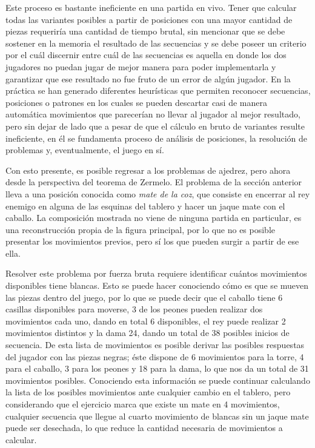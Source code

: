 \documentclass[twoside,openright,12pt,a4paper,spanish]{book}
\begin{document}
Este proceso es bastante ineficiente en una partida en vivo. Tener que calcular todas las variantes posibles a partir de posiciones con una mayor cantidad de piezas requeriría una cantidad de tiempo brutal, sin mencionar que se debe sostener en la memoria el resultado de las secuencias y se debe poseer un criterio por el cuál discernir entre cuál de las secuencias es aquella en donde los dos jugadores no puedan jugar de mejor manera para poder implementarla y garantizar que ese resultado no fue fruto de un error de algún jugador. En la práctica se han generado diferentes heurísticas que permiten reconocer secuencias, posiciones o patrones en los cuales se pueden descartar casi de manera automática movimientos que parecerían no llevar al jugador al mejor resultado, pero sin dejar de lado que a pesar de que el cálculo en bruto de variantes resulte ineficiente, en él se fundamenta proceso de análisis de posiciones, la resolución de problemas y, eventualmente, el juego en sí.

Con esto presente, es posible regresar a los problemas de ajedrez, pero ahora desde la perspectiva del teorema de Zermelo. El problema de la sección anterior lleva a una posición conocida como \emph{mate de la coz}, que consiste en encerrar al rey enemigo en alguna de las esquinas del tablero y hacer un jaque mate con el caballo. La composición mostrada no viene de ninguna partida en particular, es una reconstrucción propia de la figura principal, por lo que no es posible presentar los movimientos previos, pero sí los que pueden surgir a partir de ese ella.

Resolver este problema por fuerza bruta requiere identificar cuántos movimientos disponibles tiene blancas. Esto se puede hacer conociendo cómo es que se mueven las piezas dentro del juego, por lo que se puede decir que el caballo tiene 6 casillas disponibles para moverse, 3 de los peones pueden realizar dos movimientos cada uno, dando en total 6 disponibles, el rey puede realizar 2 movimientos distintos y la dama 24, dando un total de 38 posibles inicios de secuencia. De esta lista de movimientos es posible derivar las posibles respuestas del jugador con las piezas negras; éste dispone de 6 movimientos para la torre, 4 para el caballo, 3 para los peones y 18 para la dama, lo que nos da un total de 31 movimientos posibles. Conociendo esta información se puede continuar calculando la lista de los posibles movimientos ante cualquier cambio en el tablero, pero considerando que el ejercicio marca que existe un mate en 4 movimientos, cualquier secuencia que llegue al cuarto movimiento de blancas sin un jaque mate puede ser desechada, lo que reduce la cantidad necesaria de movimientos a calcular.
\end{document}
